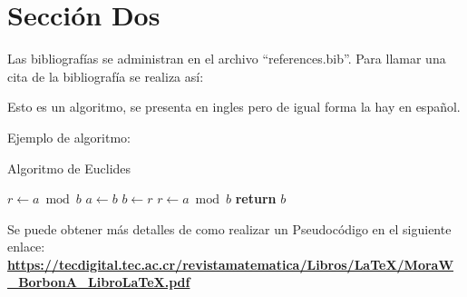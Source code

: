 \section{Sección Dos}
\label{sec:Seccion Dos}

Las bibliografías se administran en el archivo “references.bib”. Para llamar una cita de la bibliografía se realiza así: \textbf{\cite{einstein}}

Esto es un algoritmo, se presenta en ingles pero de igual forma la hay en español. 

Ejemplo de algoritmo:

\begin{algorithm}

    \caption{Algoritmo de Euclides}
    \label{euclides}
    \begin{algorithmic}[1]
        
        \State $r\gets a \bmod b$
         
            \State $a \gets b$
            \State $b \gets r$
            \State $r \gets a \bmod b$
        \EndWhile\label{euclidesfinwhile}
        \State \textbf{return} $b$
        
    \EndProcedure
    \end{algorithmic}
    
\end{algorithm}

Se puede obtener más detalles de como realizar un Pseudocódigo en el siguiente enlace: \textbf{{\footnotesize \url{https://tecdigital.tec.ac.cr/revistamatematica/Libros/LaTeX/MoraW_BorbonA_LibroLaTeX.pdf}}}